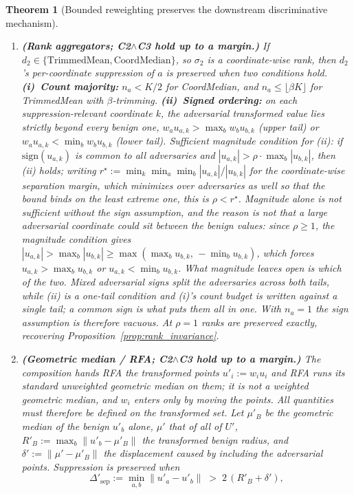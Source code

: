 \documentclass{article}
\newtheorem{theorem}{Theorem}
\begin{document}
\begin{theorem}[Bounded reweighting preserves the downstream discriminative mechanism]
\begin{enumerate}[noitemsep,topsep=2pt]
\item \textbf{(Rank aggregators; C2$\wedge$C3 hold up to a margin.)} If $d_2\in\{\text{TrimmedMean},\text{CoordMedian}\}$, so $\sigma_2$ is a coordinate-wise rank, then $d_2$'s per-coordinate suppression of $a$ is preserved when two conditions hold. \textbf{(i)~Count majority:} $n_a < K/2$ for CoordMedian, and $n_a \leq \lfloor\beta K\rfloor$ for TrimmedMean with $\beta$-trimming. \textbf{(ii)~Signed ordering:} on each suppression-relevant coordinate $k$, the adversarial transformed value lies strictly beyond every benign one, $w_a u_{a,k} > \max_b w_b u_{b,k}$ (upper tail) or $w_a u_{a,k} < \min_b w_b u_{b,k}$ (lower tail). \emph{Sufficient magnitude condition for} (ii): if $\mathrm{sign}(u_{a,k})$ is common to all adversaries and $|u_{a,k}| > \rho\cdot\max_b|u_{b,k}|$, then (ii) holds; writing $r^\star := \min_k \min_a \min_b |u_{a,k}|/|u_{b,k}|$ for the coordinate-wise separation margin, which minimizes over adversaries as well so that the bound binds on the least extreme one, this is $\rho < r^\star$. Magnitude alone is \emph{not} sufficient without the sign assumption, and the reason is not that a large adversarial coordinate could sit between the benign values: since $\rho \ge 1$, the magnitude condition gives $|u_{a,k}| > \max_b|u_{b,k}| \ge \max(\max_b u_{b,k},\, -\min_b u_{b,k})$, which forces $u_{a,k} > \max_b u_{b,k}$ or $u_{a,k} < \min_b u_{b,k}$. What magnitude leaves open is \emph{which} of the two. Mixed adversarial signs split the adversaries across both tails, while (ii) is a one-tail condition and (i)'s count budget is written against a single tail; a common sign is what puts them all in one. With $n_a{=}1$ the sign assumption is therefore vacuous. At $\rho=1$ ranks are preserved exactly, recovering Proposition~\ref{prop:rank_invariance}.
\item \textbf{(Geometric median / RFA; C2$\wedge$C3 hold up to a margin.)} The composition hands RFA the \emph{transformed points} $u'_i := w_i u_i$ and RFA runs its standard \emph{unweighted} geometric median on them; it is not a weighted geometric median, and $w_i$ enters only by moving the points. All quantities must therefore be defined on the transformed set. Let $\mu'_B$ be the geometric median of the benign $u'_b$ alone, $\mu'$ that of all of $U'$, $R'_B := \max_b\|u'_b - \mu'_B\|$ the transformed benign radius, and $\delta' := \|\mu' - \mu'_B\|$ the displacement caused by including the adversarial points. Suppression is preserved when
\[
\Delta'_{\mathrm{sep}} := \min_{a,b}\|u'_a - u'_b\| \;>\; 2\,(R'_B + \delta'),
\]
\end{enumerate}
\end{theorem}
\end{document}
